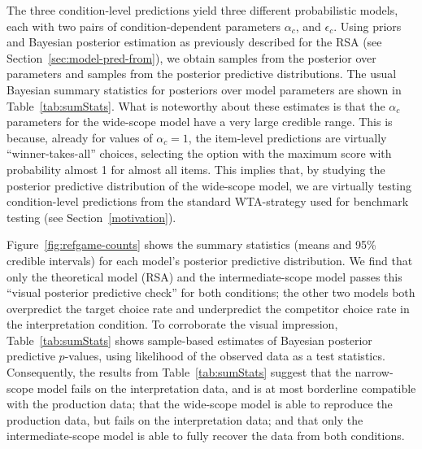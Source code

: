 \documentclass[fleqn]{article}
\begin{document}
The three condition-level predictions yield three different probabilistic models, each with two pairs of condition-dependent parameters $\alpha_{c}$, and $\epsilon_{c}$.
Using priors and Bayesian posterior estimation as previously described for the RSA (see Section~\ref{sec:model-pred-from}), we obtain samples from the posterior over parameters and samples from the posterior predictive distributions.
The usual Bayesian summary statistics for posteriors over model parameters are shown in Table~\ref{tab:sumStats}.
What is noteworthy about these estimates is that the $\alpha_{c}$ parameters for the wide-scope model have a very large credible range.
This is because, already for values of $\alpha_{c} = 1$, the item-level predictions are virtually ``winner-takes-all'' choices, selecting the option with the maximum score with probability almost 1 for almost all items.
This implies that, by studying the posterior predictive distribution of the wide-scope model, we are virtually testing condition-level predictions from the standard WTA-strategy used for benchmark testing (see Section~\ref{motivation}).

Figure~\ref{fig:refgame-counts} shows the summary statistics (means and 95\% credible intervals) for each model's posterior predictive distribution.
We find that only the theoretical model (RSA) and the intermediate-scope model passes this ``visual posterior predictive check'' for both conditions; the other two models both overpredict the target choice rate and underpredict the competitor choice rate in the interpretation condition.
To corroborate the visual impression, Table~\ref{tab:sumStats} shows sample-based estimates of Bayesian posterior predictive $p$-values, using likelihood of the observed data as a test statistics.
Consequently, the results from Table~\ref{tab:sumStats} suggest that the narrow-scope model fails on the interpretation data, and is at most borderline compatible with the production data; that the wide-scope model is able to reproduce the production data, but fails on the interpretation data; and that only the intermediate-scope model is able to fully recover the data from both conditions.


\end{document}
